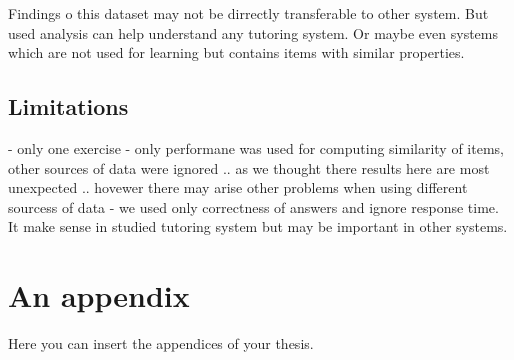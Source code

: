 \documentclass[
  digital, %
  table,   %
  nolof,     %
  nolot,     %
  nocover
]{fithesis3}
\begin{document}

Findings o this dataset may not be dirrectly transferable to other system. But used analysis can help understand any tutoring system. Or maybe even systems which are not used for learning but contains items with similar properties.

\section{Limitations}\label{limitations}

- only one exercise
- only performane was used for computing similarity of items, other sources of data were ignored .. as we thought there results here are most unexpected .. hovewer there may arise other problems when using different sourcess of data
- we used only correctness of answers and ignore response time. It make sense in studied tutoring system but may be important in other systems.

\fi

  \makeatletter\thesis@blocks@clear\makeatother

\appendix %
\chapter{An appendix}
Here you can insert the appendices of your thesis.
\end{document}

